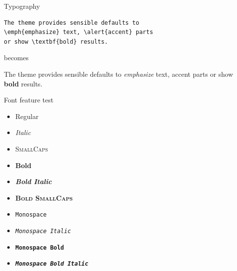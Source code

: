 \documentclass[10pt]{beamer}
\begin{document}
{
\begin{frame}[fragile]{Typography}
      \begin{verbatim}The theme provides sensible defaults to
\emph{emphasize} text, \alert{accent} parts
or show \textbf{bold} results.\end{verbatim}

  \begin{center}becomes\end{center}

  The theme provides sensible defaults to \emph{emphasize} text,
  \alert{accent} parts or show \textbf{bold} results.
\end{frame}
}

{
\begin{frame}{Font feature test}
  \begin{itemize}
    \item Regular
    \item \textit{Italic}
    \item \textsc{SmallCaps}
    \item \textbf{Bold}
    \item \textbf{\textit{Bold Italic}}
    \item \textbf{\textsc{Bold SmallCaps}}
    \item \texttt{Monospace}
    \item \texttt{\textit{Monospace Italic}}
    \item \texttt{\textbf{Monospace Bold}}
    \item \texttt{\textbf{\textit{Monospace Bold Italic}}}
  \end{itemize}
\end{frame}
}
\end{document}
